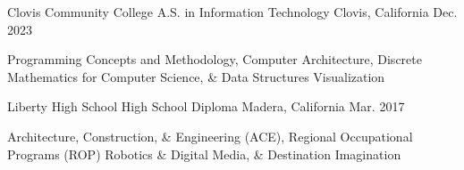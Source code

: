 \begin{cventries}

	\cventry
	{Clovis Community College} %
	{A.S. in Information Technology} %
	{Clovis, California} %
	{Dec. 2023} %
	{
		\begin{cvitems} %
		\item{Programming Concepts and Methodology, Computer Architecture, Discrete Mathematics for Computer Science, \& Data Structures Visualization}
		\end{cvitems}
	}

	\cventry
	  {Liberty High School} %
	  {High School Diploma} %
	  {Madera, California} %
	  {Mar. 2017} %
	  {
	    \begin{cvitems} %
		\item {Architecture, Construction, \& Engineering (ACE), Regional Occupational Programs (ROP) Robotics \& Digital Media, \& Destination Imagination}
	    \end{cvitems}
	  }
\end{cventries}
